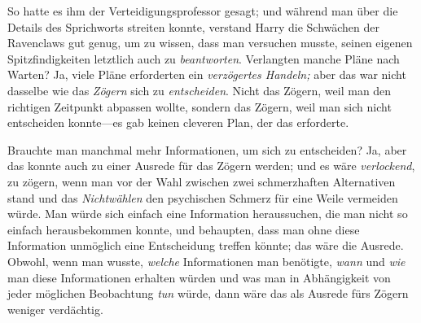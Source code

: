 
 

\hplettrineextrapara
So hatte es ihm der Verteidigungsprofessor gesagt; und während man über die Details des Sprichworts streiten konnte, verstand Harry die Schwächen der Ravenclaws gut genug, um zu wissen, dass man versuchen musste, seinen eigenen Spitzfindigkeiten letztlich auch zu \emph{beantworten}. Verlangten manche Pläne nach Warten? Ja, viele Pläne erforderten ein \emph{verzögertes Handeln;} aber das war nicht dasselbe wie das \emph{Zögern} sich zu \emph{entscheiden}. Nicht das Zögern, weil man den richtigen Zeitpunkt abpassen wollte, sondern das Zögern, weil man sich nicht entscheiden konnte—es gab keinen cleveren Plan, der das erforderte.

Brauchte man manchmal mehr Informationen, um sich zu entscheiden? Ja, aber das konnte auch zu einer Ausrede für das Zögern werden; und es wäre \emph{verlockend}, zu zögern, wenn man vor der Wahl zwischen zwei schmerzhaften Alternativen stand und das \emph{Nichtwählen} den psychischen Schmerz für eine Weile vermeiden würde. Man würde sich einfach eine Information heraussuchen, die man nicht so einfach herausbekommen konnte, und behaupten, dass man ohne diese Information unmöglich eine Entscheidung treffen könnte; das wäre die Ausrede. Obwohl, wenn man wusste, \emph{welche} Informationen man benötigte, \emph{wann} und \emph{wie} man diese Informationen erhalten würden und was man in Abhängigkeit von jeder möglichen Beobachtung \emph{tun} würde, dann wäre das als Ausrede fürs Zögern weniger verdächtig.

